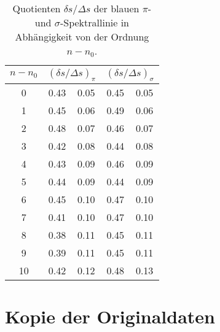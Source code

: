 \begin{table}[H]
  \centering
  \caption{Quotienten $\delta s/\Delta s$ der blauen $\pi$- und $\sigma$-Spektrallinie in Abhängigkeit von der Ordnung $n-n_0$.}
  \begin{tabular}{S[table-format=2.0] S[table-format=1.2] @{${}\pm{}$} S[table-format=1.2] S[table-format=1.2] @{${}\pm{}$} S[table-format=1.2]}
    \toprule
    {$n-n_0$} &  & \\
      & 0.43 & 0.05 & 0.45 & 0.05 \\
    1  & 0.45 & 0.06 & 0.49 & 0.06 \\
    2  & 0.48 & 0.07 & 0.46 & 0.07 \\
    3  & 0.42 & 0.08 & 0.44 & 0.08 \\
    4  & 0.43 & 0.09 & 0.46 & 0.09 \\
    5  & 0.44 & 0.09 & 0.44 & 0.09 \\
    6  & 0.45 & 0.10 & 0.47 & 0.10 \\
    7  & 0.41 & 0.10 & 0.47 & 0.10 \\
    8  & 0.38 & 0.11 & 0.45 & 0.11 \\
    9  & 0.39 & 0.11 & 0.45 & 0.11 \\
    10 & 0.42 & 0.12 & 0.48 & 0.13 \\
    \bottomrule
  \end{tabular}
  \label{tab:bluequot}
\end{table}

\section{Kopie der Originaldaten}
